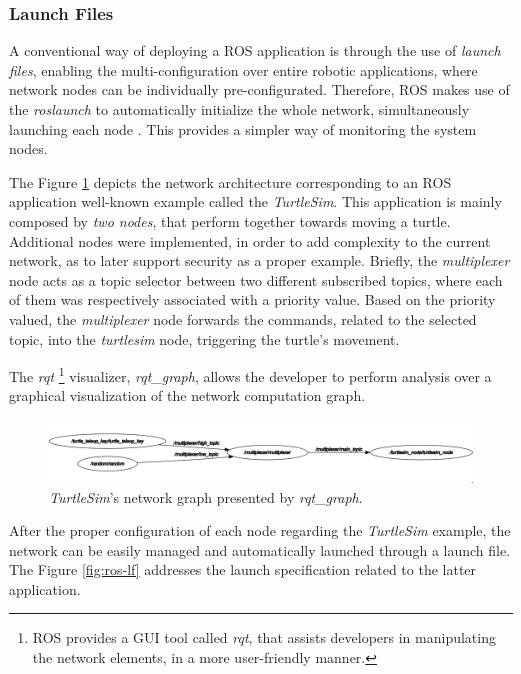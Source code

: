 \subsubsection{Launch Files}

A conventional way of deploying a ROS application is through the use of \textit{launch files}, enabling the multi-configuration over entire robotic applications, where network nodes can be individually pre-configurated. Therefore, ROS makes use of the \textit{roslaunch} to automatically initialize the whole network, simultaneously launching each node \cite{intro-ros}. This provides a simpler way of monitoring the system nodes. 

The Figure \ref{fig:ts-rqt-graph} depicts the network architecture corresponding to an ROS application well-known example called the \textit{TurtleSim}. This application is mainly composed by \textit{two nodes}, that perform together towards moving a turtle. Additional nodes were implemented, in order to add complexity to the current network, as to later support security as a proper example. Briefly, the \textit{multiplexer} node acts as a topic selector between two different subscribed topics, where each of them was respectively associated with a priority value. Based on the priority valued, the \textit{multiplexer} node forwards the commands, related to the selected topic, into the \textit{turtlesim} node, triggering the turtle's movement. 

The \textit{rqt} \footnote[1]{ROS provides a GUI tool called \textit{rqt}, that assists developers in manipulating the network elements, in a more user-friendly manner.} visualizer, \textit{rqt\_graph}, allows the developer to perform analysis over a graphical visualization of the network computation graph.

\begin{figure}[H]
    \centering
    \includegraphics[width=0.8\linewidth]{images/ts_rqt_graph.png}
    \caption{\textit{TurtleSim}'s network graph presented by \textit{rqt\_graph}.}
    \label{fig:ts-rqt-graph}
\end{figure}

After the proper configuration of each node regarding the \textit{TurtleSim} example, the network can be easily managed and automatically launched through a launch file. The Figure \ref{fig:ros-lf} addresses the launch specification related to the latter application.

